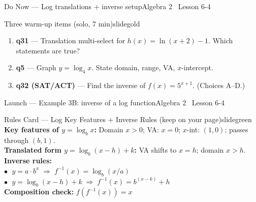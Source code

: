 \documentclass[aspectratio=169, 11pt]{beamer}
\begin{document}

\begin{frame}{Do Now --- Log translations + inverse setup}{Algebra 2 \textperiodcentered\ Lesson 6-4}
\vspace{0.2cm}
\begin{projcard}{Three warm-up items (solo, 7 min)}{slidegold}
\begin{enumerate}
  \setlength{\itemsep}{3pt}
  \item \textbf{q31} --- Translation multi-select for \(h(x) = \ln(x+2) - 1\). Which statements are true?
  \item \textbf{q5} --- Graph \(y = \log_4 x\). State domain, range, VA, \(x\)-intercept.
  \item \textbf{q32 (SAT/ACT)} --- Find the inverse of \(f(x) = 5^{x+1}\). (Choices A--D.)
\end{enumerate}
\end{projcard}
\end{frame}

\begin{frame}{Launch --- Example 3B: inverse of a log function}{Algebra 2 \textperiodcentered\ Lesson 6-4}
\vspace{0.2cm}
\begin{projcard}{Rules Card --- Log Key Features + Inverse Rules (keep on your page)}{slidegreen}
\small
\textbf{Key features of \(y = \log_b x\):} Domain \(x > 0\); VA: \(x = 0\); \(x\)-int: \((1,0)\); passes through \((b, 1)\).\\[2pt]
\textbf{Translated form \(y = \log_b(x-h)+k\):} VA shifts to \(x = h\); domain \(x > h\).\\[2pt]
\textbf{Inverse rules:}\\
\hspace*{1em}\(\bullet\;\) \(y = a\cdot b^x \;\Rightarrow\; f^{-1}(x) = \log_b(x/a)\)\\
\hspace*{1em}\(\bullet\;\) \(y = \log_b(x-h)+k \;\Rightarrow\; f^{-1}(x) = b^{(x-k)}+h\)\\[2pt]
\textbf{Composition check:} \(f(f^{-1}(x)) = x\)
\end{projcard}
\end{frame}
\end{document}
